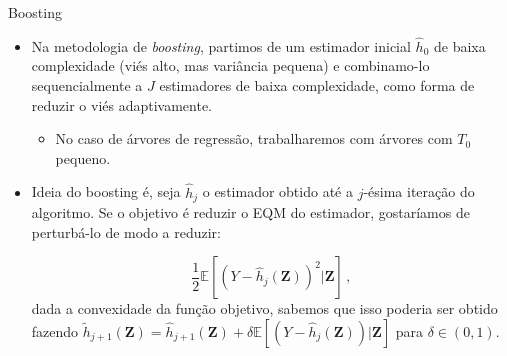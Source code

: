 \documentclass[11pt]{beamer}
\begin{document}
\begin{frame}{Boosting}
	\begin{itemize}
		\item Na metodologia de \textit{boosting}, partimos de um estimador inicial $\hat{h}_0$ de baixa complexidade (viés alto, mas variância pequena) e combinamo-lo sequencialmente a $J$ estimadores de baixa complexidade, como forma de reduzir o viés adaptivamente.
		\begin{itemize}
			\item No caso de árvores de regressão, trabalharemos com árvores com $T_0$ pequeno.
		\end{itemize}
		\item Ideia do boosting é, seja $\hat{h}_j$ o estimador obtido até a $j$-ésima iteração do algoritmo. Se o objetivo é reduzir o EQM do estimador, gostaríamos de perturbá-lo de modo a reduzir:
		
		$$\frac{1}{2}\mathbb{E}[(Y-\hat{h}_j(\boldsymbol{Z}))^2|\boldsymbol{Z}]\, ,$$
		dada a convexidade da função objetivo, sabemos que isso poderia ser  obtido fazendo
		$\tilde{h}_{j+1}(\boldsymbol{Z}) = \hat{h}_{j+1}(\boldsymbol{Z}) +\delta \mathbb{E}[(Y-\hat{h}_j(\boldsymbol{Z}))|\boldsymbol{Z}]$
		para $\delta\in (0,1)$. \hyperlink{grad_desc}{}
		\label{boosting}
	\end{itemize}
\end{frame}
\end{document}
